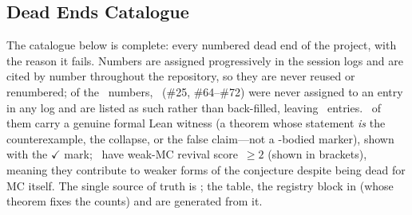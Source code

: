 \subsection{Dead Ends Catalogue}
\label{app:dead-ends}

The catalogue below is complete: every numbered dead end of the
project, with the reason it fails.  Numbers are assigned progressively in
the session logs and are cited by number throughout the repository, so
they are never reused or renumbered; of the \DEnumbers~numbers,
\DEunassigned\ (\#25, \#64--\#72) were never assigned to an entry in any
log and are listed as such rather than back-filled, leaving
\DEentries~entries.  \DEwitnessed~of them carry a genuine formal Lean
witness (a theorem whose statement \emph{is} the counterexample, the
collapse, or the false claim---not a -bodied marker), shown
with the {\color{leanink}\sffamily\footnotesize$\checkmark$} mark;
\DErevivable~have weak-MC revival score~$\geq 2$ (shown in brackets),
meaning they contribute to weaker forms of the conjecture despite being
dead for MC itself.  The single source of truth is
; the table, the registry block in
 (whose theorem 
fixes the counts) and  are generated
from it.

